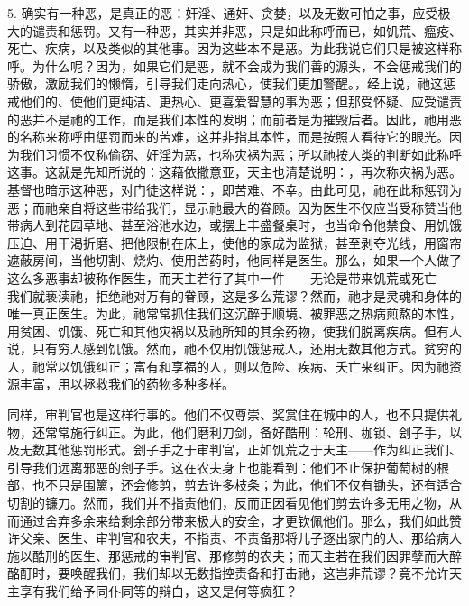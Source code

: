 5. 确实有一种恶，是真正的恶：奸淫、通奸、贪婪，以及无数可怕之事，应受极大的谴责和惩罚。\newline{}又有一种恶，其实并非恶，只是如此称呼而已，如饥荒、瘟疫、死亡、疾病，以及类似的其他事。因为这些本不是恶。为此我说它们只是被这样称呼。为什么呢？因为，如果它们是恶，就不会成为我们善的源头，不会惩戒我们的骄傲，激励我们的懒惰，引导我们走向热心，使我们更加警醒。，经上说，祂这惩戒他们的、使他们更纯洁、更热心、更喜爱智慧的事为恶；但那受怀疑、应受谴责的恶并不是祂的工作，而是我们本性的发明；而前者是为摧毁后者。因此，祂用恶的名称来称呼由惩罚而来的苦难，这并非指其本性，而是按照人看待它的眼光。因为我们习惯不仅称偷窃、奸淫为恶，也称灾祸为恶；所以祂按人类的判断如此称呼这事。这就是先知所说的：这藉依撒意亚，天主也清楚说明：，再次称灾祸为恶。基督也暗示这种恶，对门徒这样说：，即苦难、不幸。由此可见，祂在此称惩罚为恶；而祂亲自将这些带给我们，显示祂最大的眷顾。因为医生不仅应当受称赞当他带病人到花园草地、甚至浴池水边，或摆上丰盛餐桌时，也当命令他禁食、用饥饿压迫、用干渴折磨、把他限制在床上，使他的家成为监狱，甚至剥夺光线，用窗帘遮蔽房间，当他切割、烧灼、使用苦药时，他同样是医生。那么，如果一个人做了这么多恶事却被称作医生，而天主若行了其中一件——无论是带来饥荒或死亡——我们就亵渎祂，拒绝祂对万有的眷顾，这是多么荒谬？然而，祂才是灵魂和身体的唯一真正医生。为此，祂常常抓住我们这沉醉于顺境、被罪恶之热病煎熬的本性，用贫困、饥饿、死亡和其他灾祸以及祂所知的其余药物，使我们脱离疾病。但有人说，只有穷人感到饥饿。然而，祂不仅用饥饿惩戒人，还用无数其他方式。贫穷的人，祂常以饥饿纠正；富有和享福的人，则以危险、疾病、夭亡来纠正。因为祂资源丰富，用以拯救我们的药物多种多样。\par

同样，审判官也是这样行事的。他们不仅尊崇、奖赏住在城中的人，也不只提供礼物，还常常施行纠正。为此，他们磨利刀剑，备好酷刑：轮刑、枷锁、刽子手，以及无数其他惩罚形式。刽子手之于审判官，正如饥荒之于天主——作为纠正我们、引导我们远离邪恶的刽子手。这在农夫身上也能看到：他们不止保护葡萄树的根部，也不只是围篱，还会修剪，剪去许多枝条；为此，他们不仅有锄头，还有适合切割的镰刀。然而，我们并不指责他们，反而正因看见他们剪去许多无用之物，从而通过舍弃多余来给剩余部分带来极大的安全，才更钦佩他们。那么，我们如此赞许父亲、医生、审判官和农夫，不指责、不责备那将儿子逐出家门的人、那给病人施以酷刑的医生、那惩戒的审判官、那修剪的农夫；而天主若在我们因罪孽而大醉酩酊时，要唤醒我们，我们却以无数指控责备和打击祂，这岂非荒谬？竟不允许天主享有我们给予同仆同等的辩白，这又是何等疯狂？\par

